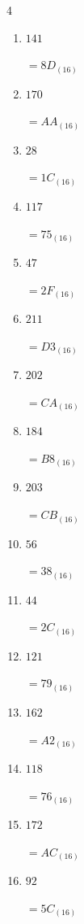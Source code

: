 \begin{multicols}{4}
\begin{enumerate}
        $=D6_{(16)}$

  \item $141$

        $=8D_{(16)}$

  \item $170$

        $=AA_{(16)}$

  \item $28$

        $=1C_{(16)}$

  \item $117$

        $=75_{(16)}$

  \item $47$

        $=2F_{(16)}$

  \item $211$

        $=D3_{(16)}$

  \item $202$

        $=CA_{(16)}$

  \item $184$

        $=B8_{(16)}$

  \item $203$

        $=CB_{(16)}$

  \item $56$

        $=38_{(16)}$

  \item $44$

        $=2C_{(16)}$

  \item $121$

        $=79_{(16)}$

\columnbreak %

  \item $162$

        $=A2_{(16)}$

  \item $118$

        $=76_{(16)}$

  \item $172$

        $=AC_{(16)}$

  \item $92$

        $=5C_{(16)}$


\end{enumerate}
\end{multicols}
